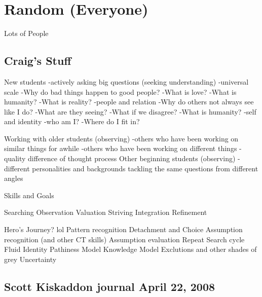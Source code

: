 \chapter{Random (Everyone)}

\begin{authors}
	Lots of People
\end{authors}

\section{Craig's Stuff}

New students
-actively asking big questions (seeking understanding)
		-universal scale
			-Why do bad things happen to good people?
			-What is love?
			-What is humanity?
			-What is reality?
		-people and relation
			-Why do others not always see like I do?
			-What are they seeing?
			-What if we disagree?
			-What is humanity?
		-self and identity
			-who am I?
			-Where do I fit in?

Working with older students (observing)
	-others who have been working on similar things for awhile
	-others who have been working on different things
	-quality difference of thought process
Other beginning students (observing)
-different personalities and backgrounds tackling the same questions from 
different angles

Skills and Goals

Searching
Observation
Valuation
Striving
Integration
Refinement

Hero's Journey? lol 
Pattern recognition
Detachment and Choice
Assumption recognition (and other CT skills)
Assumption evaluation
Repeat Search cycle
Fluid Identity
Pathiness 
Model Knowledge
Model Exclutions and other shades of grey
Uncertainty

\section{Scott Kiskaddon journal April 22, 2008}

